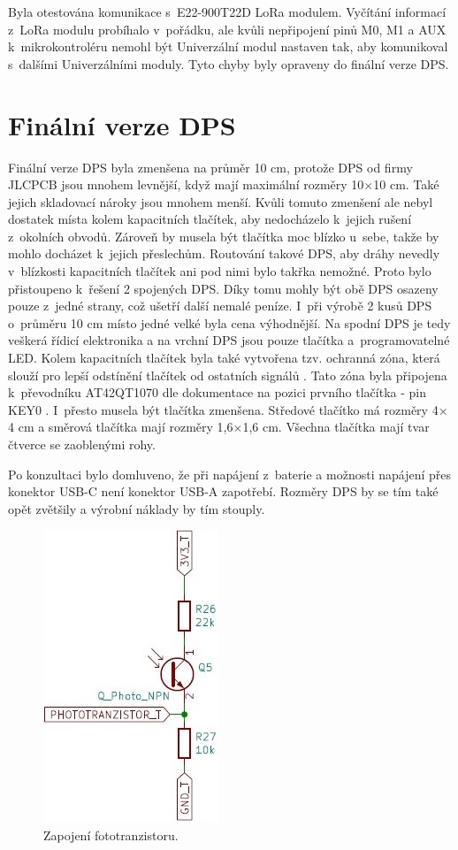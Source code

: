 Byla otestována komunikace s~E22-900T22D LoRa modulem. Vyčítání informací z~LoRa modulu probíhalo v~pořádku, ale kvůli nepřipojení pinů M0, M1 a AUX k~mikrokontroléru nemohl být Univerzální modul 
nastaven tak, aby komunikoval s~dalšími Univerzálními moduly. Tyto chyby byly opraveny do finální verze DPS.

\chapter{Finální verze DPS}
Finální verze DPS byla zmenšena na průměr 10 cm, protože DPS od firmy JLCPCB jsou mnohem levnější, když mají maximální rozměry 10$\times$10 cm. Také jejich skladovací nároky jsou mnohem  menší. 
Kvůli tomuto zmenšení ale nebyl dostatek místa 
kolem kapacitních tlačítek, aby nedocházelo k~jejich rušení z~okolních obvodů. Zároveň by musela být tlačítka moc blízko u~sebe, takže by mohlo docházet k~jejich přeslechům. Routování takové 
DPS, aby dráhy nevedly v~blízkosti kapacitních tlačítek ani pod nimi bylo takřka nemožné. Proto bylo přistoupeno k~řešení 2 spojených DPS. Díky tomu mohly být obě DPS osazeny pouze z~jedné strany,
což ušetří další nemalé peníze. I~při výrobě 2 kusů DPS o~průměru 10 cm místo jedné velké byla cena výhodnější. Na spodní DPS je tedy veškerá řídicí elektronika a na vrchní DPS jsou pouze tlačítka 
a~programovatelné LED. Kolem kapacitních tlačítek byla také vytvořena tzv. ochranná zóna, která slouží pro lepší odstínění tlačítek od ostatních signálů \cite{conv_cap_but_AT42QT1070_dtsh}. Tato zóna 
byla připojena k~převodníku AT42QT1070 dle dokumentace na pozici prvního tlačítka - pin KEY0 \cite{conv_cap_but_AT42QT1070_dtsh}. I~přesto musela být tlačítka zmenšena. Středové tlačítko má rozměry 
4$\times$4 cm a směrová tlačítka mají rozměry 1,6$\times$1,6 cm. Všechna tlačítka mají tvar čtverce se zaoblenými rohy. 

Po konzultaci bylo domluveno, že při napájení z~baterie a možnosti napájení přes konektor USB-C není konektor USB-A zapotřebí. Rozměry DPS by se tím také opět zvětšily a výrobní náklady by tím 
stouply. 

\begin{figure}[!h]
  \begin{center}
    \includegraphics[scale=0.7]{obrazky/fototranzistor.jpg}
  \end{center}
  \caption[Zapojení fototranzistoru]{Zapojení fototranzistoru.}
\end{figure}


